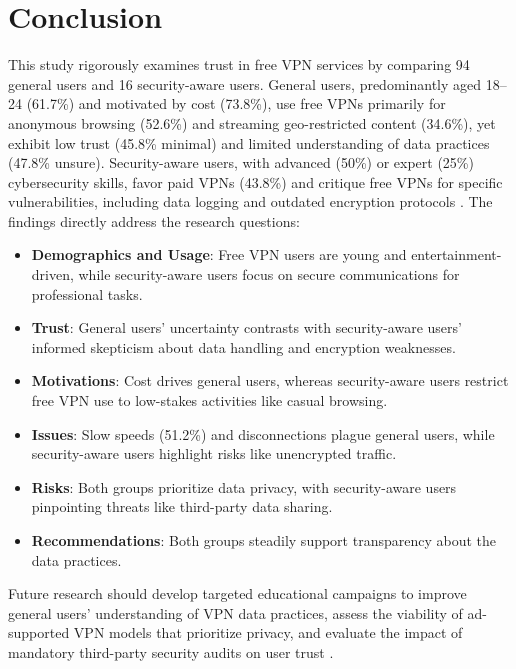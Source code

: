 \documentclass[11pt,a4paper]{article}
\begin{document}
\section{Conclusion}
This study rigorously examines trust in free VPN services by comparing 94 general users and 16 security-aware users. General users, predominantly aged 18--24 (61.7\%) and motivated by cost (73.8\%), use free VPNs primarily for anonymous browsing (52.6\%) and streaming geo-restricted content (34.6\%), yet exhibit low trust (45.8\% minimal) and limited understanding of data practices (47.8\% unsure). Security-aware users, with advanced (50\%) or expert (25\%) cybersecurity skills, favor paid VPNs (43.8\%) and critique free VPNs for specific vulnerabilities, including data logging and outdated encryption protocols \citep{Shetty2025}. The findings directly address the research questions:

\begin{itemize}
    \item \textbf{Demographics and Usage}: Free VPN users are young and entertainment-driven, while security-aware users focus on secure communications for professional tasks.
    \item \textbf{Trust}: General users’ uncertainty contrasts with security-aware users’ informed skepticism about data handling and encryption weaknesses.
    \item \textbf{Motivations}: Cost drives general users, whereas security-aware users restrict free VPN use to low-stakes activities like casual browsing.
    \item \textbf{Issues}: Slow speeds (51.2\%) and disconnections plague general users, while security-aware users highlight risks like unencrypted traffic.
    \item \textbf{Risks}: Both groups prioritize data privacy, with security-aware users pinpointing threats like third-party data sharing.
    \item \textbf{Recommendations}: Both groups steadily support transparency about the data practices. 
\end{itemize}

Future research should develop targeted educational campaigns to improve general users’ understanding of VPN data practices, assess the viability of ad-supported VPN models that prioritize privacy, and evaluate the impact of mandatory third-party security audits on user trust \citep{Namara2020, Xu2020, Dutkowska2022}.



\end{document}
